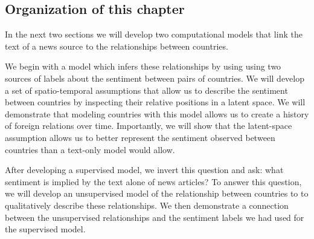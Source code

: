 

\subsection{Organization of this chapter}

In the next two sections we will develop two computational models that
link the text of a news source to the relationships between countries.

We begin with a model which infers these relationships by using using
two sources of labels about the sentiment between pairs of countries.
We will develop a set of spatio-temporal assumptions that allow us to
describe the sentiment between countries by inspecting their relative
positions in a latent space.  We will demonstrate that modeling
countries with this model allows us to create a history of foreign
relations over time.  Importantly, we will show that the latent-space
assumption allows us to better represent the sentiment observed
between countries than a text-only model would allow.

After developing a supervised model, we invert this question and ask:
what sentiment is implied by the text alone of news articles?  To
answer this question, we will develop an unsupervised model of the
relationship between countries to to qualitatively describe these
relationships.  We then demonstrate a connection between the
unsupervised relationships and the sentiment labels we had used for
the supervised model.
